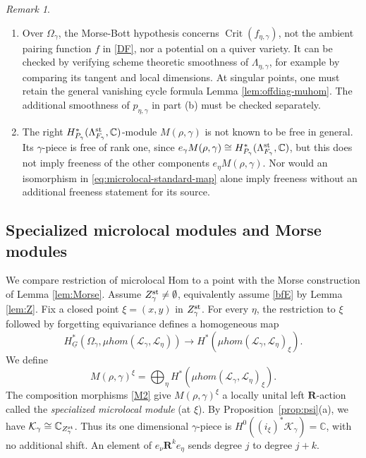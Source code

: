 \documentclass[11pt,reqno]{amsart}
\theoremstyle{definition}
\theoremstyle{remark}
\newtheorem{Remark}[Theorem]{Remark}
\def\bbC{\mathbb C}
\def\dG{\underline G}
\def\muhom{\mu hom}
\def\bR{\mathbf R}
\begin{document}
\begin{Remark}\hfill
\begin{enumerate}[label=$\mathrm{(\alph*)}$,leftmargin=8mm]
\item 
Over $\Omega_\gamma$, the Morse-Bott hypothesis concerns $\operatorname{Crit}(f_{\eta,\gamma})$, not the ambient
pairing function $f$ in \eqref{DF}, nor a potential on a quiver
variety. It can be checked by
verifying scheme theoretic smoothness of $\Lambda_{\eta,\gamma}$,
for example by comparing its tangent and local dimensions.  At singular points, one must
retain the general vanishing cycle formula Lemma \ref{lem:offdiag-muhom}.
The additional smoothness of $p_{\eta,\gamma}$ in part (b) must be
checked separately.
\item
The right $H^*_{P_\gamma}(\Lambda^{\rm st}_{F_\gamma},\bbC)$-module $M(\rho,\gamma)$
is not known to be free in general. Its $\gamma$-piece is free
of rank one, since
$e_\gamma M(\rho,\gamma)\cong H^*_{P_\gamma}(\Lambda^{\rm st}_{F_\gamma},\bbC)$,
but this does not imply freeness of the other components
$e_\eta M(\rho,\gamma)$. Nor would an isomorphism in
\eqref{eq:microlocal-standard-map} alone imply freeness without
an additional freeness statement for its source.
\end{enumerate}
\end{Remark}
\fi%

\subsection{Specialized microlocal modules and Morse modules}
\label{subsec:microlocal-morse}
We compare restriction of microlocal Hom to a point with the
Morse construction of Lemma \ref{lem:Morse}.
Assume $Z_\gamma^{\rm st}\ne\emptyset$, equivalently assume \eqref{bfE} by Lemma \ref{lem:Z}.
Fix a closed point $\xi=(x,y)$ in $Z_\gamma^{\rm st}$.
For every $\eta$, the restriction to $\xi$ followed by forgetting
equivariance defines a homogeneous map
\[
H_{\dG}^*(\Omega_\gamma,\muhom(\mathscr L_\gamma,\mathscr L_\eta))
\longrightarrow H^*(\muhom(\mathscr L_\gamma,\mathscr L_\eta)_\xi).
\]
We define
\[
 M(\rho,\gamma)^\xi=
 \bigoplus_\eta H^*(\muhom(\mathscr L_\gamma,\mathscr L_\eta)_\xi).
\]
The composition morphisms \ref{M2} give $M(\rho,\gamma)^\xi$ a
locally unital left $\bR$-action called the \emph{specialized microlocal module} (at $\xi$).
By Proposition~\ref{prop:psi}(a), we have $\mathcal K_\gamma\cong
\bbC_{Z_\gamma^{\rm st}}$. Thus its one dimensional $\gamma$-piece
is $H^0((i_\xi)^*\mathcal K_\gamma)=\bbC$, with no additional shift.
An element of $e_\nu\bR^k e_\eta$ sends degree $j$ to degree $j+k$.
\end{document}
